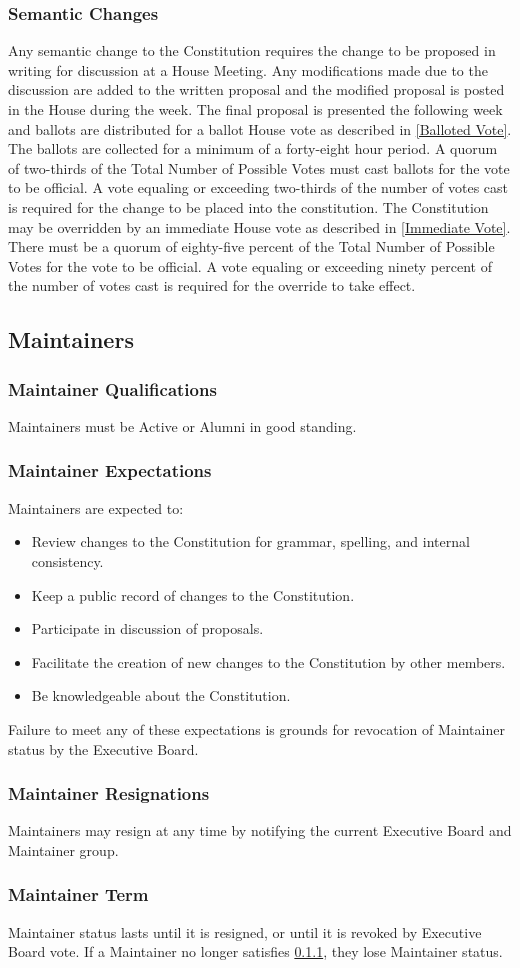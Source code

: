 \documentclass{article}
\newcommand{\asection}[1]{\subsection{#1} \label{#1}}
\newcommand{\asubsection}[1]{\subsubsection{#1} \label{#1}}
\begin{document}
\asubsection{Semantic Changes}
Any semantic change to the Constitution requires the change to be proposed in writing for discussion at a House Meeting. Any modifications made due to the discussion are added to the written proposal and the modified proposal is posted in the House during the week. The final proposal is presented the following week and ballots are distributed for a ballot House vote as described in \ref{Balloted Vote}. The ballots are collected for a minimum of a forty-eight hour period. A quorum of two-thirds
of the Total Number of Possible Votes must cast ballots for the vote to be official. A vote equaling or exceeding two-thirds of the number of votes cast is required for the change to be placed into the constitution. The Constitution may be overridden by an immediate House vote as described in \ref{Immediate Vote}. There must be a quorum of eighty-five percent of the Total Number of Possible Votes for the vote to be official. A vote equaling or exceeding ninety percent of the number of votes cast is required for the override to take effect.

\asection{Maintainers}

\asubsection{Maintainer Qualifications}
Maintainers must be Active or Alumni in good standing.

\asubsection{Maintainer Expectations}
Maintainers are expected to:
\begin{itemize}
    \item Review changes to the Constitution for grammar, spelling, and internal consistency.
    \item Keep a public record of changes to the Constitution.
    \item Participate in discussion of proposals.
    \item Facilitate the creation of new changes to the Constitution by other members.
    \item Be knowledgeable about the Constitution.
\end{itemize}
Failure to meet any of these expectations is grounds for revocation of Maintainer status by the Executive Board.

\asubsection{Maintainer Resignations}
Maintainers may resign at any time by notifying the current Executive Board and Maintainer group.

\asubsection{Maintainer Term}
Maintainer status lasts until it is resigned, or until it is revoked by Executive Board vote.
If a Maintainer no longer satisfies \ref{Maintainer Qualifications}, they lose Maintainer status.
\end{document}
